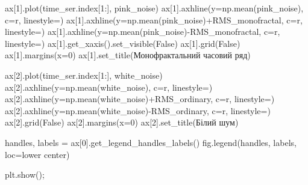 \documentclass[
  letterpaper,
]{report}
\newenvironment{Shaded}{\begin{snugshade}}{\end{snugshade}}
\newcommand{\DecValTok}[1]{\textcolor[rgb]{0.68,0.00,0.00}{#1}}
\newcommand{\NormalTok}[1]{\textcolor[rgb]{0.00,0.23,0.31}{#1}}
\newcommand{\OperatorTok}[1]{\textcolor[rgb]{0.37,0.37,0.37}{#1}}
\newcommand{\StringTok}[1]{\textcolor[rgb]{0.13,0.47,0.30}{#1}}
\newcommand{\VariableTok}[1]{\textcolor[rgb]{0.07,0.07,0.07}{#1}}
\begin{document}
\begin{Shaded}
\begin{Highlighting}[]
\NormalTok{ax[}\DecValTok{1}\NormalTok{].plot(time\_ser.index[}\DecValTok{1}\NormalTok{:], pink\_noise)}
\NormalTok{ax[}\DecValTok{1}\NormalTok{].axhline(y}\OperatorTok{=}\NormalTok{np.mean(pink\_noise), c}\OperatorTok{=}\StringTok{\textquotesingle{}r\textquotesingle{}}\NormalTok{, linestyle}\OperatorTok{=}\StringTok{\textquotesingle{}{-}{-}\textquotesingle{}}\NormalTok{)}
\NormalTok{ax[}\DecValTok{1}\NormalTok{].axhline(y}\OperatorTok{=}\NormalTok{np.mean(pink\_noise)}\OperatorTok{+}\NormalTok{RMS\_monofractal, c}\OperatorTok{=}\StringTok{\textquotesingle{}r\textquotesingle{}}\NormalTok{, linestyle}\OperatorTok{=}\StringTok{\textquotesingle{}{-}\textquotesingle{}}\NormalTok{)}
\NormalTok{ax[}\DecValTok{1}\NormalTok{].axhline(y}\OperatorTok{=}\NormalTok{np.mean(pink\_noise)}\OperatorTok{{-}}\NormalTok{RMS\_monofractal, c}\OperatorTok{=}\StringTok{\textquotesingle{}r\textquotesingle{}}\NormalTok{, linestyle}\OperatorTok{=}\StringTok{\textquotesingle{}{-}\textquotesingle{}}\NormalTok{)}
\NormalTok{ax[}\DecValTok{1}\NormalTok{].get\_xaxis().set\_visible(}\VariableTok{False}\NormalTok{)}
\NormalTok{ax[}\DecValTok{1}\NormalTok{].grid(}\VariableTok{False}\NormalTok{)}
\NormalTok{ax[}\DecValTok{1}\NormalTok{].margins(x}\OperatorTok{=}\DecValTok{0}\NormalTok{)}
\NormalTok{ax[}\DecValTok{1}\NormalTok{].set\_title(}\StringTok{\textquotesingle{}Монофрактальний часовий ряд\textquotesingle{}}\NormalTok{)}

\NormalTok{ax[}\DecValTok{2}\NormalTok{].plot(time\_ser.index[}\DecValTok{1}\NormalTok{:], white\_noise)}
\NormalTok{ax[}\DecValTok{2}\NormalTok{].axhline(y}\OperatorTok{=}\NormalTok{np.mean(white\_noise), c}\OperatorTok{=}\StringTok{\textquotesingle{}r\textquotesingle{}}\NormalTok{, linestyle}\OperatorTok{=}\StringTok{\textquotesingle{}{-}{-}\textquotesingle{}}\NormalTok{)}
\NormalTok{ax[}\DecValTok{2}\NormalTok{].axhline(y}\OperatorTok{=}\NormalTok{np.mean(white\_noise)}\OperatorTok{+}\NormalTok{RMS\_ordinary, c}\OperatorTok{=}\StringTok{\textquotesingle{}r\textquotesingle{}}\NormalTok{, linestyle}\OperatorTok{=}\StringTok{\textquotesingle{}{-}\textquotesingle{}}\NormalTok{)}
\NormalTok{ax[}\DecValTok{2}\NormalTok{].axhline(y}\OperatorTok{=}\NormalTok{np.mean(white\_noise)}\OperatorTok{{-}}\NormalTok{RMS\_ordinary, c}\OperatorTok{=}\StringTok{\textquotesingle{}r\textquotesingle{}}\NormalTok{, linestyle}\OperatorTok{=}\StringTok{\textquotesingle{}{-}\textquotesingle{}}\NormalTok{)}
\NormalTok{ax[}\DecValTok{2}\NormalTok{].grid(}\VariableTok{False}\NormalTok{)}
\NormalTok{ax[}\DecValTok{2}\NormalTok{].margins(x}\OperatorTok{=}\DecValTok{0}\NormalTok{)}
\NormalTok{ax[}\DecValTok{2}\NormalTok{].set\_title(}\StringTok{\textquotesingle{}Білий шум\textquotesingle{}}\NormalTok{)}

\NormalTok{handles, labels }\OperatorTok{=}\NormalTok{ ax[}\DecValTok{0}\NormalTok{].get\_legend\_handles\_labels()}
\NormalTok{fig.legend(handles, labels, loc}\OperatorTok{=}\StringTok{\textquotesingle{}lower center\textquotesingle{}}\NormalTok{)}

\NormalTok{plt.show()}\OperatorTok{;}
\end{Highlighting}
\end{Shaded}
\end{document}

